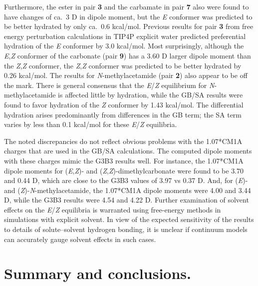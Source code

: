 \documentclass[12pt]{report}
\begin{document}
Furthermore, the ester in pair \textbf{3} and the carbamate in pair \textbf{7} also were found to have changes of ca.\ 3 D in dipole moment, but the \textit{E} conformer was predicted to be better hydrated by only ca.\ 0.6 kcal/mol. Previous results for pair \textbf{3} from free energy perturbation calculations in TIP4P explicit water predicted preferential hydration of the \textit{E} conformer by 3.0 kcal/mol.\cite{ev} Most surprisingly, although the \textit{E},\textit{Z} conformer of the carbonate (pair \textbf{9}) has a 3.60 D larger dipole moment than the \textit{Z},\textit{Z} conformer, the \textit{Z},\textit{Z} conformer was predicted to be better hydrated by 0.26 kcal/mol. The results for \textit{N}-methylacetamide (pair \textbf{2}) also appear to be off the mark. There is general consensus that the \textit{E}/\textit{Z} equilibrium for \textit{N}-methylacetamide is affected little by hydration,\cite{gao,mantz} while the GB/SA results were found to favor hydration of the \textit{Z} conformer by 1.43 kcal/mol. The differential hydration arises predominantly from differences in the GB term; the SA term varies by less than 0.1 kcal/mol for these \textit{E}/\textit{Z} equilibria.

The noted discrepancies do not reflect obvious problems with the 1.07*CM1A charges that are used in the GB/SA calculations. The computed dipole moments with these charges mimic the G3B3 results well. For instance, the 1.07*CM1A dipole moments for (\textit{E},\textit{Z})- and (\textit{Z},\textit{Z})-dimethylcarbonate were found to be 3.70 and 0.44 D, which are close to the G3B3 values of 3.97 vs 0.37 D. And, for (\textit{E})- and (\textit{Z})-\textit{N}-methylacetamide, the 1.07*CM1A dipole moments were 4.00 and 3.44 D, while the G3B3 results were 4.54 and 4.22 D. Further examination of solvent effects on the \textit{E}/\textit{Z} equilibria is warranted using free-energy methods in simulations with explicit solvent. In view of the expected sensitivity of the results to details of solute--solvent hydrogen bonding, it is unclear if continuum models can accurately gauge solvent effects in such cases.


\section{Summary and conclusions.}
\end{document}
